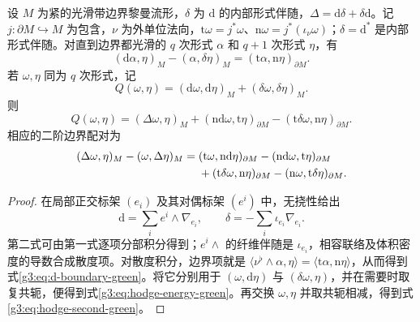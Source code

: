 \begin{lemma}\label{g3:lem:hodge-boundary-green}
	设 \(M\) 为紧的光滑带边界黎曼流形，\(\delta\) 为 \(\mathrm d\) 的内部形式伴随，\(\Delta=\mathrm d\delta+\delta\mathrm d\)。记 \(j:\partial M\hookrightarrow M\) 为包含，\(\nu\) 为外单位法向，\(\mathrm t\omega=j^*\omega\)、\(\mathrm n\omega=j^*(\iota_\nu\omega)\)；\(\delta=\mathrm d^*\) 是内部形式伴随。对直到边界都光滑的 \(q\) 次形式 \(\alpha\) 和 \(q+1\) 次形式 \(\eta\)，有
	\begin{equation}\label{g3:eq:d-boundary-green}
		(\mathrm d\alpha,\eta)_M-(\alpha,\delta\eta)_M
		=(\mathrm t\alpha,\mathrm n\eta)_{\partial M}.
	\end{equation}
	若 \(\omega,\eta\) 同为 \(q\) 次形式，记
	\[
		Q(\omega,\eta)=(\mathrm d\omega,\mathrm d\eta)_M
		+(\delta\omega,\delta\eta)_M.
	\]
	则
	\begin{equation}\label{g3:eq:hodge-energy-green}
		Q(\omega,\eta)=(\Delta\omega,\eta)_M
		+(\mathrm n\mathrm d\omega,\mathrm t\eta)_{\partial M}
		-(\mathrm t\delta\omega,\mathrm n\eta)_{\partial M}.
	\end{equation}
	相应的二阶边界配对为
	\begin{align}\label{g3:eq:hodge-second-green}
		(\Delta\omega,\eta)_M-(\omega,\Delta\eta)_M
		={}&(\mathrm t\omega,\mathrm n\mathrm d\eta)_{\partial M}
		-(\mathrm n\mathrm d\omega,\mathrm t\eta)_{\partial M}\notag\\
		&+(\mathrm t\delta\omega,\mathrm n\eta)_{\partial M}
		-(\mathrm n\omega,\mathrm t\delta\eta)_{\partial M}.
	\end{align}
\end{lemma}
\begin{proof}
	在局部正交标架 \((e_i)\) 及其对偶标架 \((e^i)\) 中，无挠性给出
	\[
		\mathrm d=\sum_i e^i\wedge\nabla_{e_i},\qquad
		\delta=-\sum_i\iota_{e_i}\nabla_{e_i}.
	\]
	第二式可由第一式逐项分部积分得到；\(e^i\wedge\) 的纤维伴随是 \(\iota_{e_i}\)，相容联络及体积密度的导数合成散度项。对散度积分，边界项就是 \(\langle\nu^\flat\wedge\alpha,\eta\rangle=\langle\mathrm t\alpha,\mathrm n\eta\rangle\)，从而得到式\eqref{g3:eq:d-boundary-green}。将它分别用于 \((\omega,\mathrm d\eta)\) 与 \((\delta\omega,\eta)\)，并在需要时取复共轭，便得到式\eqref{g3:eq:hodge-energy-green}。再交换 \(\omega,\eta\) 并取共轭相减，得到式\eqref{g3:eq:hodge-second-green}。
\end{proof}

